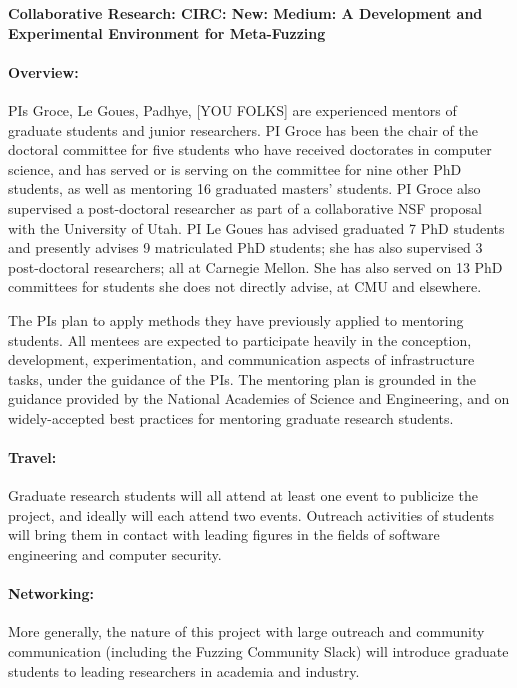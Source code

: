 \documentclass[12pt]{article}
\begin{document}

\begin{center}
{\Large\sf\textbf{Collaborative Research: CIRC: New: Medium: A Development and 
Experimental Environment for Meta-Fuzzing}}
\end{center}

\paragraph{Overview:} PIs Groce, Le Goues, Padhye, [YOU FOLKS] are experienced mentors of graduate students and junior researchers. PI Groce has been the chair of the doctoral committee for five students who have received doctorates in computer science, and has served or is serving on the committee for nine other PhD students, as well as mentoring 16 graduated masters' students. PI Groce also supervised a post-doctoral researcher as part of a collaborative NSF proposal with the University of Utah.  PI Le Goues has advised graduated 7 PhD students and presently advises 9 matriculated PhD students; she has also supervised 3 post-doctoral researchers; all at Carnegie Mellon.  She has also served on 13 PhD committees for students she does not directly advise, at CMU and elsewhere. 


The PIs plan to apply methods they have previously applied to mentoring students. All mentees are expected to participate heavily in the conception, development, experimentation, and communication aspects of infrastructure tasks, under the guidance of the PIs. The mentoring plan is grounded in the guidance provided by the National Academies of Science
and Engineering, and on widely-accepted best practices for mentoring graduate research students.


\paragraph{Travel:}  Graduate research students will all attend at least one event to  publicize the project, and ideally will each attend two events.  Outreach activities of students will bring them in contact with leading figures in the fields of software engineering and computer security.

\paragraph{Networking:}  More generally, the nature of this project with large outreach and community communication (including the Fuzzing Community Slack) will introduce graduate students to leading researchers in academia and industry.
\end{document}

